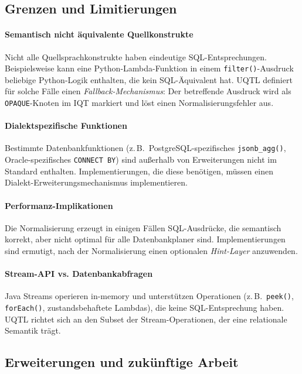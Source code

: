 \subsection{Grenzen und Limitierungen}
\label{subsec:grenzen}

\paragraph{Semantisch nicht äquivalente Quellkonstrukte}
Nicht alle Quellsprachkonstrukte haben eindeutige SQL-Entsprechungen.
Beispielsweise kann eine Python-Lambda-Funktion in einem \texttt{filter()}-Ausdruck
beliebige Python-Logik enthalten, die kein SQL-Äquivalent hat. UQTL definiert
für solche Fälle einen \emph{Fallback-Mechanismus}: Der betreffende Ausdruck
wird als \texttt{OPAQUE}-Knoten im IQT markiert und löst einen Normalisierungsfehler
aus.

\paragraph{Dialektspezifische Funktionen}
Bestimmte Datenbankfunktionen (z.\,B.\ PostgreSQL-spezifisches \texttt{jsonb\_agg()},
Oracle-spezifisches \texttt{CONNECT BY}) sind außerhalb von Erweiterungen nicht
im Standard enthalten. Implementierungen, die diese benötigen, müssen einen
Dialekt-Erweiterungsmechanismus implementieren.

\paragraph{Performanz-Implikationen}
Die Normalisierung erzeugt in einigen Fällen SQL-Ausdrücke, die semantisch
korrekt, aber nicht optimal für alle Datenbankplaner sind. Implementierungen
sind ermutigt, nach der Normalisierung einen optionalen \emph{Hint-Layer}
anzuwenden.

\paragraph{Stream-API vs. Datenbankabfragen}
Java Streams operieren in-memory und unterstützen Operationen (z.\,B.\
\texttt{peek()}, \texttt{forEach()}, zustandsbehaftete Lambdas), die keine
SQL-Entsprechung haben. UQTL richtet sich an den Subset der Stream-Operationen,
der eine relationale Semantik trägt.

\subsection{Erweiterungen und zukünftige Arbeit}
\label{subsec:erweiterungen}

